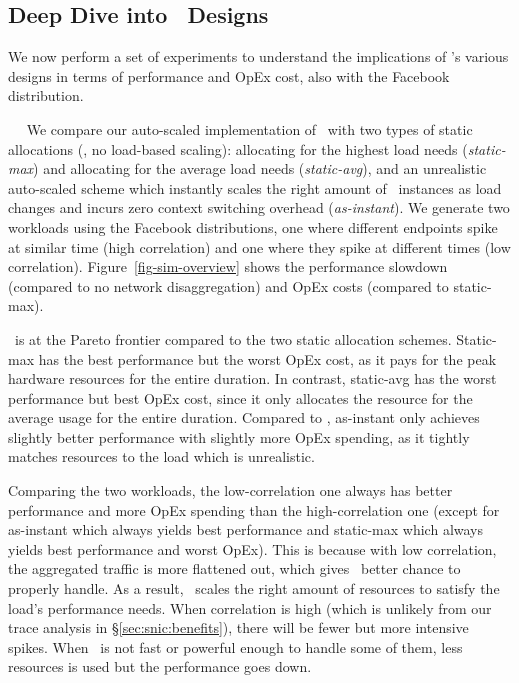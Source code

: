 

\subsection{Deep Dive into \snic\ Designs}
\label{sec:snic:deepdive}

We now perform a set of experiments to understand the implications of \snic's various designs in terms of performance and OpEx cost, also with the Facebook distribution.

~~
We compare our auto-scaled implementation of \snic\ with two types of static allocations (\ie, no load-based scaling): allocating for the highest load needs ({\em static-max}) and allocating for the average load needs ({\em static-avg}), and an unrealistic auto-scaled scheme which instantly scales the right amount of \nt\ instances as load changes and incurs zero context switching overhead ({\em as-instant}).
We generate two workloads using the Facebook distributions, one where different endpoints spike at similar time (high correlation) and one where they spike at different times (low correlation).
Figure~\ref{fig-sim-overview} shows the performance slowdown (compared to no network disaggregation) and OpEx costs (compared to static-max).

\snic\ is at the Pareto frontier compared to the two static allocation schemes. Static-max has the best performance but the worst OpEx cost, as it pays for the peak hardware resources for the entire duration. In contrast, static-avg has the worst performance but best OpEx cost, since it only allocates the resource for the average usage for the entire duration.
Compared to \snic, as-instant only achieves slightly better performance with slightly more OpEx spending, as it tightly matches resources to the load which is unrealistic.

Comparing the two workloads, the low-correlation one always has better performance and more OpEx spending than the high-correlation one (except for as-instant which always yields best performance and static-max which always yields best performance and worst OpEx).
This is because with low correlation, the aggregated traffic is more flattened out, which gives \snic\ better chance to properly handle. As a result, \snic\ scales the right amount of resources to satisfy the load's performance needs.
When correlation is high (which is unlikely from our trace analysis in \S\ref{sec:snic:benefits}), there will be fewer but more intensive spikes. When \snic\ is not fast or powerful enough to handle some of them, less resources is used but the performance goes down.


